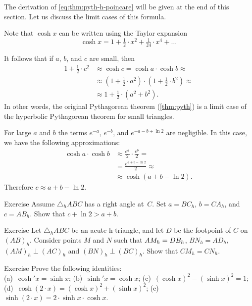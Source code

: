 The derivation of \ref{eq:thm:pyth-h-poincare} will be given at the end of this section.
Let us discuss the limit cases of this formula.

Note that $\cosh x$ can be written using the Taylor expansion
\[\cosh x=1+\tfrac1{2}\cdot x^2+\tfrac1{24}\cdot x^4+\dots\]

It follows that if $a$, $b$, and $c$ are small, then
\begin{align*}
1+\tfrac1{2}\cdot c^2&\approx \cosh c=\cosh a\cdot\cosh b\approx
\\
&\approx(1+\tfrac1{2}\cdot a^2)\cdot (1+\tfrac1{2}\cdot b^2)
\approx 
\\
&\approx
1+\tfrac1{2}\cdot (a^2+b^2).
\end{align*}
In other words, the original Pythagorean theorem (\ref{thm:pyth}) is a limit case of the hyperbolic Pythagorean theorem for small triangles.

For large $a$ and $b$ the terms $e^{-a}$, $e^{-b}$, and $e^{-a-b+\ln 2}$ are negligible.
In this case, we have the following approximations:
\begin{align*}
\cosh a\cdot\cosh b&\approx \tfrac{e^a}2\cdot\tfrac{e^b}2=
\\
&=\frac{e^{a+b-\ln 2}}{2}\approx
\\
&\approx \cosh(a+b-\ln 2).
\end{align*}
Therefore $c\approx a+b-\ln 2$. 

\begin{thm}{Exercise}\label{ex:c+1>a+b}
Assume $\triangle_h ABC$ has a right angle at~$C$.
Set $a=BC_h$, $b=CA_h$, and $c=AB_h$.
Show that $c+\ln 2>a+b$.

\end{thm}

\begin{thm}{Exercise}\label{ex:pyth-cor-h}
Let $\triangle_h A B C$ be an acute h-triangle, and let $D$ be the footpoint of $C$ on $(AB)_h$.
Consider points $M$ and $N$ such that $AM_h\z=DB_h$, $BN_h=AD_h$, $(AM)_h\perp(AC)_h$ and $(BN)_h\perp(BC)_h$.
Show that $CM_h=CN_h$.
\end{thm}

\begin{thm}{Exercise}\label{ex:hyp-fun}
Prove the following identities:\\
(a)~$\cosh' x=\sinh x$;
\qquad
(b)~$\sinh'x=\cosh x$;
\qquad
(c)~$(\cosh x)^2-(\sinh x)^2=1$;\\
(d)~$\cosh (2\cdot x)=(\cosh x)^2+(\sinh x)^2$;
\qquad
(e)~$\sinh (2\cdot x)=2\cdot\sinh x\cdot \cosh x$.

\end{thm}

